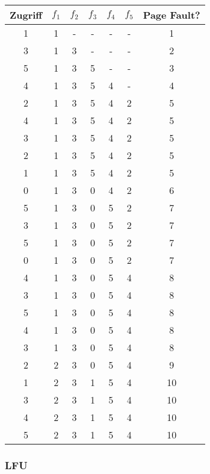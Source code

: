 \documentclass[10pt,a4paper]{article}
\begin{document}
\begin{tabular}{c|c|c|c|c|c|c}
  Zugriff & $f_{1}$ & $f_{2}$ & $f_{3}$ & $f_{4}$ & $f_{5}$ & Page Fault?\\\hline
  1 & 1 & - & - & - & - & 1\\
  3 & 1 & 3 & - & - & - & 2\\
  5 & 1 & 3 & 5 & - & - & 3\\
  4 & 1 & 3 & 5 & 4 & - & 4\\
  2 & 1 & 3 & 5 & 4 & 2 & 5\\
  4 & 1 & 3 & 5 & 4 & 2 & 5\\
  3 & 1 & 3 & 5 & 4 & 2 & 5\\
  2 & 1 & 3 & 5 & 4 & 2 & 5\\
  1 & 1 & 3 & 5 & 4 & 2 & 5\\
  0 & 1 & 3 & 0 & 4 & 2 & 6\\
  5 & 1 & 3 & 0 & 5 & 2 & 7\\
  3 & 1 & 3 & 0 & 5 & 2 & 7\\
  5 & 1 & 3 & 0 & 5 & 2 & 7\\
  0 & 1 & 3 & 0 & 5 & 2 & 7\\
  4 & 1 & 3 & 0 & 5 & 4 & 8\\
  3 & 1 & 3 & 0 & 5 & 4 & 8\\
  5 & 1 & 3 & 0 & 5 & 4 & 8\\
  4 & 1 & 3 & 0 & 5 & 4 & 8\\
  3 & 1 & 3 & 0 & 5 & 4 & 8\\
  2 & 2 & 3 & 0 & 5 & 4 & 9\\
  1 & 2 & 3 & 1 & 5 & 4 & 10\\
  3 & 2 & 3 & 1 & 5 & 4 & 10\\
  4 & 2 & 3 & 1 & 5 & 4 & 10\\
  5 & 2 & 3 & 1 & 5 & 4 & 10
\end{tabular}

\subsubsection*{LFU}
\end{document}
